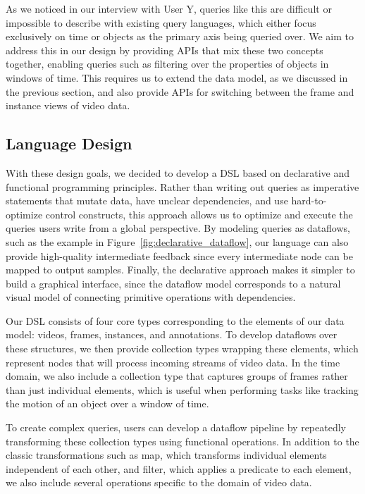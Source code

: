 As we noticed in our interview with User Y, queries like this are difficult or impossible to describe with existing query languages, which either focus exclusively on time or objects as the primary axis being queried over. We aim to address this in our design by providing APIs that mix these two concepts together, enabling queries such as filtering over the properties of objects in windows of time. This requires us to extend the data model, as we discussed in the previous section, and also provide APIs for switching between the frame and instance views of video data.

\subsection{Language Design}
With these design goals, we decided to develop a DSL based on declarative and functional programming principles. Rather than writing out queries as imperative statements that mutate data, have unclear dependencies, and use hard-to-optimize control constructs, this approach allows us to optimize and execute the queries users write from a global perspective. By modeling queries as dataflows, such as the example in Figure~\ref{fig:declarative_dataflow}, our language can also provide high-quality intermediate feedback since every intermediate node can be mapped to output samples. Finally, the declarative approach makes it simpler to build a graphical interface, since the dataflow model corresponds to a natural visual model of connecting primitive operations with dependencies.

Our DSL consists of four core types corresponding to the elements of our data model: videos, frames, instances, and annotations. To develop dataflows over these structures, we then provide collection types wrapping these elements, which represent nodes that will process incoming streams of video data. In the time domain, we also include a collection type that captures groups of frames rather than just individual elements, which is useful when performing tasks like tracking the motion of an object over a window of time.

To create complex queries, users can develop a dataflow pipeline by repeatedly transforming these collection types using functional operations. In addition to the classic transformations such as map, which transforms individual elements independent of each other, and filter, which applies a predicate to each element, we also include several operations specific to the domain of video data.

